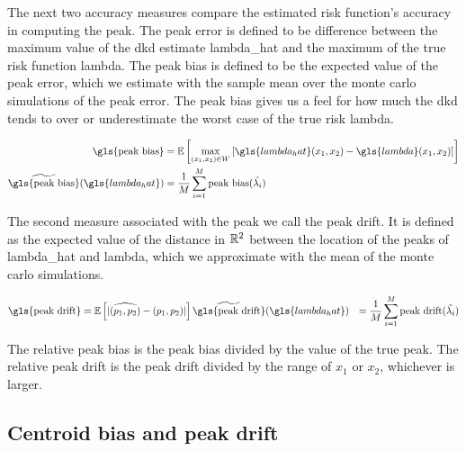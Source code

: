 The next two accuracy measures compare the estimated risk function's accuracy in computing the peak.
The \gls{peak error} is defined to be difference between the maximum value of the \gls{dkd} estimate \gls{lambda_hat} and the maximum of the true risk function \gls{lambda}.
The \gls{peak bias} is defined to be the expected value of the \gls{peak error}, which we estimate with the sample mean over the monte carlo simulations of the \gls{peak error}.
The \gls{peak bias} gives us a feel for how much the \gls{dkd} tends to over or underestimate the worst case of the true risk \gls{lambda}.

\begin{align}
    \mbox{\gls{peak bias}}  & = \E \left[
                                \max_{(x_1,x_2) \in W} \left[
                                    {\gls{lambda_hat}\xvec} - \gls{lambda}\xvec
                                \right]
                            \right]
                            \\
    \widetilde{\mbox{\gls{peak bias}}}(\gls{lambda_hat}) & = \frac{1}{M} \sum_{i=1}^{M} \mbox{peak bias}(\hat{\lambda_i})
\end{align}

The second measure associated with the peak we call the \gls{peak drift}.
It is defined as the expected value of the distance in $\mathbb{R}^2$ between the location of the peaks of \gls{lambda_hat} and \gls{lambda}, which we approximate with the mean of the monte carlo simulations.

\begin{align}
    \mbox{\gls{peak drift}} & = \E \left[
                            |\widehat{(p_1, p_2)} - (p_1, p_2)|
                        \right]
    \widetilde{\mbox{\gls{peak drift}}}(\gls{lambda_hat}) & = \frac{1}{M} \sum_{i=1}^{M} \mbox{peak drift}(\hat{\lambda_i})
\end{align}

The \gls{relative peak bias} is the \gls{peak bias} divided by the value of the true peak.
The \gls{relative peak drift} is the \gls{peak drift} divided by the range of $x_1$ or $x_2$, whichever is larger.

\subsection{Centroid bias and peak drift}
\label{subsec:method:centroid_bias}

